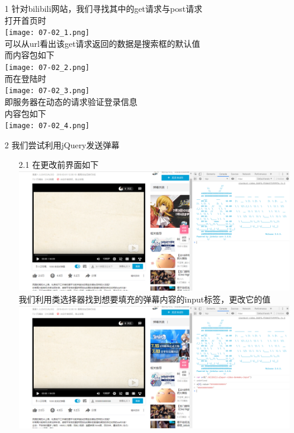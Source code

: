 \documentclass[UTF8]{ctexart}
\begin{document}
    \begin{enumerate}
        \item[1]
        针对bilibili网站，我们寻找其中的get请求与post请求\\        
        打开首页时\\
        \texttt{[image: 07-02\_1.png]}\\
        可以从url看出该get请求返回的数据是搜索框的默认值\\
        而内容包如下\\
        \texttt{[image: 07-02\_2.png]}\\
        而在登陆时\\
        \texttt{[image: 07-02\_3.png]}\\
        即服务器在动态的请求验证登录信息\\
        内容包如下\\
        \texttt{[image: 07-02\_4.png]}\\
        \item[2] 
        我们尝试利用jQuery发送弹幕
        \begin{enumerate}
            \item[2.1]
            在更改前界面如下\\ 
            \includegraphics[scale=0.3]{06-27_3.png}
            我们利用类选择器找到想要填充的弹幕内容的input标签，更改它的值\\
            \includegraphics[scale=0.3]{06-27_4.png}

\end{enumerate}
\end{enumerate}
\end{document}
